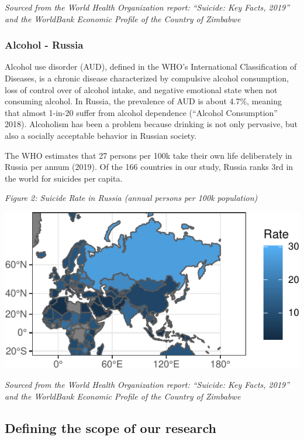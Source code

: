 \documentclass[]{article}
\begin{document}
\emph{Sourced from the World Health Organization report: ``Suicide: Key
Facts, 2019'' and the WorldBank Economic Profile of the Country of
Zimbabwe}

\subsubsection{Alcohol - Russia}\label{alcohol---russia}

Alcohol use disorder (AUD), defined in the WHO's International
Classification of Diseases, is a chronic disease characterized by
compulsive alcohol consumption, loss of control over of alcohol intake,
and negative emotional state when not consuming alcohol. In Russia, the
prevalence of AUD is about 4.7\%, meaning that almost 1-in-20 suffer
from alcohol dependence (``Alcohol Consumption'' 2018). Alcoholism has
been a problem because drinking is not only pervasive, but also a
socially acceptable behavior in Russian society.

The WHO estimates that 27 persons per 100k take their own life
deliberately in Russia per annum (2019). Of the 166 countries in our
study, Russia ranks 3rd in the world for suicides per capita.

\emph{Figure 2: Suicide Rate in Russia (annual persons per 100k
population)}

\begin{center}\includegraphics{Project_Report_files/figure-latex/russia_map_plot-1} \end{center}

\emph{Sourced from the World Health Organization report: ``Suicide: Key
Facts, 2019'' and the WorldBank Economic Profile of the Country of
Zimbabwe}

\subsection{Defining the scope of our
research}\label{defining-the-scope-of-our-research}
\end{document}
